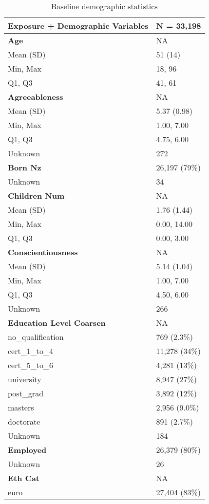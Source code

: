 \documentclass[
  single column]{article}
\begin{document}
\begin{longtable}[]{@{}ll@{}}

\caption{\label{tbl-table-demography}Baseline demographic statistics}

\tabularnewline

\toprule\noalign{}
\textbf{Exposure + Demographic Variables} & \textbf{N = 33,198} \\
\midrule\noalign{}
\endhead
\bottomrule\noalign{}
\endlastfoot
\textbf{Age} & NA \\
Mean (SD) & 51 (14) \\
Min, Max & 18, 96 \\
Q1, Q3 & 41, 61 \\
\textbf{Agreeableness} & NA \\
Mean (SD) & 5.37 (0.98) \\
Min, Max & 1.00, 7.00 \\
Q1, Q3 & 4.75, 6.00 \\
Unknown & 272 \\
\textbf{Born Nz} & 26,197 (79\%) \\
Unknown & 34 \\
\textbf{Children Num} & NA \\
Mean (SD) & 1.76 (1.44) \\
Min, Max & 0.00, 14.00 \\
Q1, Q3 & 0.00, 3.00 \\
\textbf{Conscientiousness} & NA \\
Mean (SD) & 5.14 (1.04) \\
Min, Max & 1.00, 7.00 \\
Q1, Q3 & 4.50, 6.00 \\
Unknown & 266 \\
\textbf{Education Level Coarsen} & NA \\
no\_qualification & 769 (2.3\%) \\
cert\_1\_to\_4 & 11,278 (34\%) \\
cert\_5\_to\_6 & 4,281 (13\%) \\
university & 8,947 (27\%) \\
post\_grad & 3,892 (12\%) \\
masters & 2,956 (9.0\%) \\
doctorate & 891 (2.7\%) \\
Unknown & 184 \\
\textbf{Employed} & 26,379 (80\%) \\
Unknown & 26 \\
\textbf{Eth Cat} & NA \\
euro & 27,404 (83\%) \\

\end{longtable}
\end{document}

